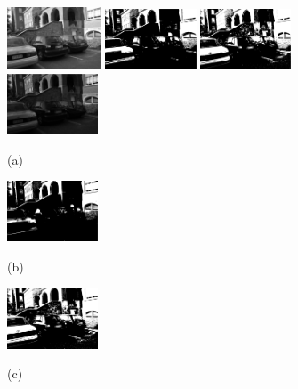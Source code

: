 \documentclass[conference,compsoc]{IEEEtran}
\begin{document}
\begin{figure}[htb]

\begin{minipage}[b]{.3\linewidth}
  \centering
  \centerline{\includegraphics[width=2.8cm]{leuven1}}
\end{minipage}
\hfill
\begin{minipage}[b]{0.3\linewidth}
  \centering
  \centerline{\includegraphics[width=2.7cm]{leuven1_otsu}}
\end{minipage}
\hfill
\begin{minipage}[b]{0.3\linewidth}
  \centering
  \centerline{\includegraphics[width=2.7cm]{leuven1_numcc}}
\end{minipage}

\begin{minipage}[b]{.3\linewidth}
  \centering
  \centerline{\includegraphics[width=2.7cm]{leuven4}}
   \centerline{(a)}\medskip
\end{minipage}
\hfill
\begin{minipage}[b]{0.3\linewidth}
  \centering
  \centerline{\includegraphics[width=2.7cm]{leuven4_otsu}}
   \centerline{(b)}\medskip
\end{minipage}
\hfill
\begin{minipage}[b]{0.3\linewidth}
  \centering
  \centerline{\includegraphics[width=2.7cm]{leuven4_numcc}}
   \centerline{(c)}\medskip
\end{minipage}


\end{figure}
\end{document}
